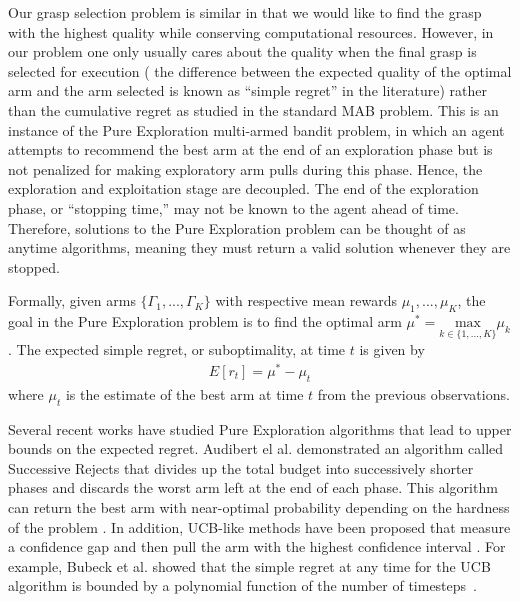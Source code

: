 \documentclass[journal,transmag]{IEEEtran}%
\begin{document}
Our grasp selection problem is similar in that we would like to find the grasp with the highest quality while conserving computational resources.
However, in our problem one only usually cares about the quality when the final grasp is selected for execution ( the difference between the expected quality of the optimal arm and the arm selected is known as ``simple regret'' in the literature) rather than the cumulative regret as studied in the standard MAB problem.
This is an instance of the Pure Exploration multi-armed bandit problem\cite{bubeck2009pure}, in which an agent attempts to recommend the best arm at the end of an exploration phase but is not penalized for making exploratory arm pulls during this phase.
Hence, the exploration and exploitation stage are decoupled. 
The end of the exploration phase, or ``stopping time,'' may not be known to the agent ahead of time.
Therefore, solutions to the Pure Exploration problem can be thought of as anytime algorithms, meaning they must return a valid solution whenever they are stopped.

Formally, given arms $\lbrace \Gamma_1, ..., \Gamma_K \rbrace$ with respective mean rewards $\mu_1, ..., \mu_K$, the goal in the Pure Exploration problem is to find the optimal arm $\mu^* = \underset{k\in\lbrace 1, ..., K \rbrace}{\mbox{max}} \mu_k$.
The expected simple regret, or suboptimality, at time $t$ is given by
\vspace{-2ex}
\begin{align}\label{eq:simple_regret}
E[r_t] = \mu^* - \mu_t
\end{align}
\noindent where $\mu_t$ is the estimate of the best arm at time $t$ from the previous observations.

Several recent works have studied Pure Exploration algorithms that lead to upper bounds on the expected regret.
Audibert el al. demonstrated an algorithm called Successive Rejects that divides up the total budget into successively shorter phases and discards the worst arm left at the end of each phase.
This algorithm can return the best arm with near-optimal probability depending on the hardness of the problem \cite{audibert2010best}.
In addition, UCB-like methods have been proposed that measure a confidence gap and then pull the arm with the highest confidence interval \cite{gabillon2012best}.
For example, Bubeck et al. showed that the simple regret at any time for the UCB algorithm is bounded by a polynomial function of the number of timesteps~\cite{bubeck2009pure}.
\end{document}
